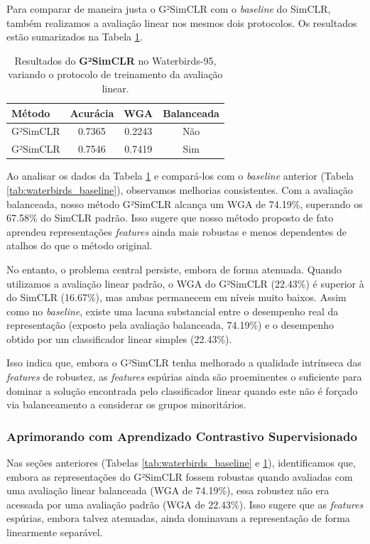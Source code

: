 Para comparar de maneira justa o G²SimCLR com o \textit{baseline} do SimCLR, também realizamos a avaliação linear nos mesmos dois protocolos. Os resultados estão sumarizados na Tabela \ref{tab:waterbirds_g2simclr}.

\begin{table}[h]
\centering
\caption{Resultados do \textbf{G²SimCLR} no Waterbirds-95, variando o protocolo de treinamento da avaliação linear.}
\label{tab:waterbirds_g2simclr}
\setlength{\tabcolsep}{8pt}
\begin{tabular}{lccc}
\toprule
Método & Acurácia & WGA & Balanceada \\
\midrule
G²SimCLR & 0.7365 & 0.2243 & Não \\
G²SimCLR & 0.7546 & 0.7419 & Sim \\
\bottomrule
\end{tabular}
\end{table}

Ao analisar os dados da Tabela \ref{tab:waterbirds_g2simclr} e compará-los com o \textit{baseline} anterior (Tabela \ref{tab:waterbirds_baseline}), observamos melhorias consistentes. Com a avaliação balanceada, nosso método G²SimCLR alcança um WGA de 74.19\%, superando os 67.58\% do SimCLR padrão. Isso sugere que nosso método proposto de fato aprendeu representações \textit{features} ainda mais robustas e menos dependentes de atalhos do que o método original.

No entanto, o problema central persiste, embora de forma atenuada. Quando utilizamos a avaliação linear padrão, o WGA do G²SimCLR (22.43\%) é superior à do SimCLR (16.67\%), mas ambas permanecem em níveis muito baixos. Assim como no \textit{baseline}, existe uma lacuna substancial entre o desempenho real da representação (exposto pela avaliação balanceada, 74.19\%) e o desempenho obtido por um classificador linear simples (22.43\%).

Isso indica que, embora o G²SimCLR tenha melhorado a qualidade intrínseca das \textit{features} de robustez, as \textit{features} espúrias ainda são proeminentes o suficiente para dominar a solução encontrada pelo classificador linear quando este não é forçado via balanceamento a considerar os grupos minoritários.

\subsubsection{Aprimorando com Aprendizado Contrastivo Supervisionado}

Nas seções anteriores (Tabelas \ref{tab:waterbirds_baseline} e \ref{tab:waterbirds_g2simclr}), identificamos que, embora as representações do G²SimCLR fossem robustas quando avaliadas com uma avaliação linear balanceada (WGA de 74.19\%), essa robustez não era acessada por uma avaliação padrão (WGA de 22.43\%). Isso sugere que as \textit{features} espúrias, embora talvez atenuadas, ainda dominavam a representação de forma linearmente separável.

